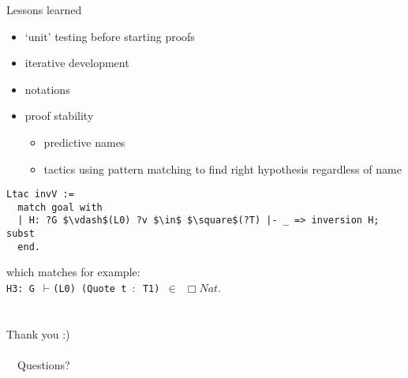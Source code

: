 \documentclass{beamer}
\newcommand{\qtype}[1]{\Box#1}
\begin{document}
\begin{frame}[fragile]{Lessons learned}
\begin{itemize}
  \item `unit' testing before starting proofs
  \item iterative development
  \item notations
  \item proof stability
  \begin{itemize}
    \item predictive names
    \item tactics using pattern matching to find right hypothesis regardless of name
  \end{itemize}
\end{itemize}
\begin{lstlisting}[mathescape=true, basicstyle=\small\ttfamily]
Ltac invV :=
  match goal with
  | H: ?G $\vdash$(L0) ?v $\in$ $\square$(?T) |- _ => inversion H; subst
  end.
\end{lstlisting}
which matches for example: \\ \texttt{H3: G $\vdash$(L0) (Quote t $:$ T1) $\in$ $\qtype{Nat}$}.

\end{frame}

\section{}
\begin{frame}

 {\Huge{Thank you :)}}
 \\~\  \\~\
 Questions?
\end{frame}
\end{document}

